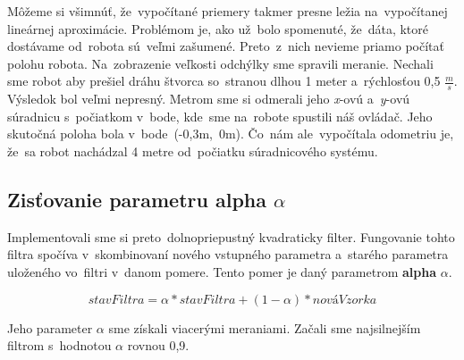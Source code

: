 Môžeme si všimnúť, že~vypočítané priemery takmer presne ležia na~vypočítanej lineárnej aproximácie. Problémom je, ako už~bolo spomenuté, že~dáta,
ktoré dostávame od~robota sú~veľmi zašumené. Preto~z~nich nevieme priamo počítať polohu robota. Na~zobrazenie veľkosti odchýlky sme spravili
meranie. Nechali sme robot aby prešiel dráhu štvorca so~stranou dlhou 1 meter a~rýchlosťou 0,5 \(\frac{m}{s}\). Výsledok bol veľmi nepresný.
Metrom sme si odmerali jeho \textit{x}-ovú a~\textit{y}-ovú súradnicu s~počiatkom v~bode, kde~sme na~robote spustili náš ovládač. Jeho skutočná
poloha bola v~bode~(-0,3m,~0m). Čo~nám ale~vypočítala odometriu je, že~sa robot nachádzal 4 metre od~počiatku súradnicového systému.

\subsection{Zisťovanie parametru alpha $\alpha$}

Implementovali sme si preto~dolnopriepustný kvadraticky filter. Fungovanie tohto filtra spočíva v~skombinovaní nového vstupného parametra a~starého parametra
uloženého vo~filtri v~danom pomere. Tento pomer je daný parametrom \textbf{alpha} $\alpha$.

\begin{equation}
	stavFiltra = \alpha * stavFiltra + (1 - \alpha) * nováVzorka
	\label{eq:stateOfFilter}
\end{equation}

Jeho parameter $\alpha$ sme získali viacerými meraniami. Začali sme najsilnejším filtrom s~hodnotou $\alpha$ rovnou  0,9.

